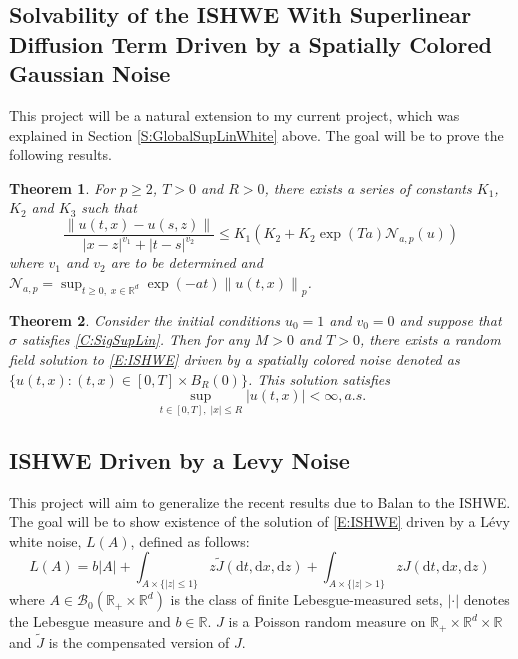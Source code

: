 \documentclass[a4paper,11pt]{article}
\numberwithin{equation}{section}
\theoremstyle{plain}
\newtheorem{theorem}{Theorem}[section]
\theoremstyle{definition}
\newcommand{\ud}{\ensuremath{\mathrm{d} }}
\newcommand{\Norm}[1]{\left\|  #1   \right\|}
\newcommand{\R}{\mathbb{R}}
\numberwithin{NQ}{section}
\numberwithin{LQ}{section}
\numberwithin{ZQ}{section}
\begin{document}
\subsection{Solvability of the ISHWE With Superlinear Diffusion Term Driven by a Spatially Colored Gaussian Noise}
This project will be a natural extension to my current project, which was explained in Section \ref{S:GlobalSupLinWhite} above. The goal will be to prove the following results.

	\begin{theorem}
For $p \ge 2$, $T>0$ and $R>0$, there exists a series of constants $K_1$, $K_2$ and $K_3$ such that 
	\[
		\frac{\Norm{u(t,x)-u(s,z)}}{|x-z|^{v_1} + |t-s|^{v_2}} \le K_1\left(K_2 + K_2\exp(T a) \mathcal{N}_{a,p}(u)\right)
	\]
where $v_1$ and $v_2$ are to be determined and $\mathcal{N}_{a,p} = \sup_{t \ge 0, \; x \in \R^d} \exp(-at)\Norm{u(t,x)}_p$.
	\end{theorem}

	\begin{theorem}
Consider the initial conditions $u_0=1$ and $v_0=0$ and suppose that $\sigma$ satisfies \eqref{C:SigSupLin}. Then for any $M>0$ and $T>0$, there exists a random field solution to \eqref{E:ISHWE} driven by a spatially colored noise denoted as $\{ u(t,x): (t,x) \in [0,T]\times B_R(0) \}$. This solution satisfies 
	\begin{equation}
	\sup_{t\in[0,T],\; |x| \le R} |u(t,x)| < \infty, a.s.
	\end{equation}
\end{theorem}

\subsection{ISHWE Driven by a Levy Noise}
This project will aim to generalize the recent results due to Balan \cite{Balan22} to the ISHWE. The goal will be to show existence of the solution of \eqref{E:ISHWE} driven by a L\'evy white noise, $L(A)$, defined as follows:
	\[
		L(A) = b|A| + \int_{A \times \{|z| \le 1\}} z \tilde{J}(\ud t, \ud x, \ud z) +    \int_{A \times \{|z| > 1\}} z J(\ud t, \ud x, \ud z)\,
	\]
where $A \in \mathcal{B}_0(\R_{+}\times \R^d)$ is the class of finite Lebesgue-measured sets, $|\cdot|$ denotes the Lebesgue measure and $b \in \R$. $J$ is a Poisson random measure on $\R_+ \times \R^d \times \R$ and $\tilde{J}$ is the compensated version of $J$.
\end{document}
